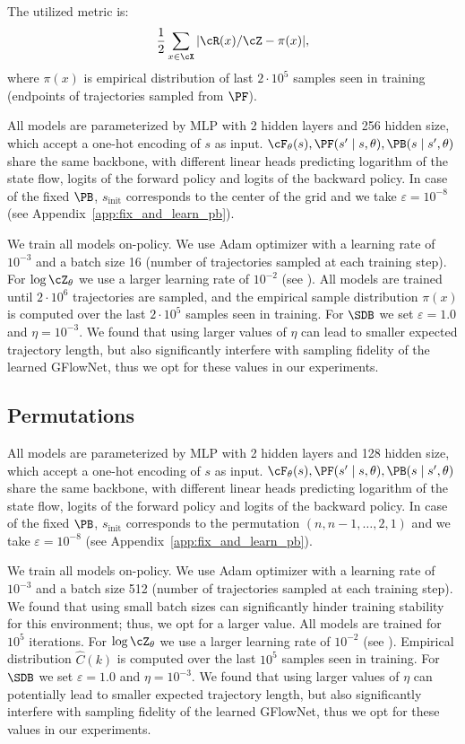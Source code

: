 The utilized metric is:
$$\frac{1}{2}\sum_{x \in \cX} |\cR(x) / \cZ - \pi(x)|,$$
where $\pi(x)$ is empirical distribution of last $2 \cdot 10^5$ samples seen in training (endpoints of trajectories sampled from $\PF$).


All models are parameterized by MLP with 2 hidden layers and 256 hidden size, which accept a one-hot encoding of $s$ as input. $\cF_{\theta}(s), \PF(s' \mid s, \theta), \PB(s \mid s', \theta)$ share the same backbone, with different linear heads predicting logarithm of the state flow, logits of the forward policy and logits of the backward policy. In case of the fixed $\PB$, $s_{\text{init}}$ corresponds to the center of the grid and we take $\varepsilon = 10^{-8}$ (see Appendix~\ref{app:fix_and_learn_pb}).

We train all models on-policy. We use Adam optimizer with a learning rate of $10^{-3}$ and a batch size 16 (number of trajectories sampled at each training step). For $\log \cZ_{\theta}$ we use a larger learning rate of $10^{-2}$ (see  \cite{malkin2022trajectory}). All models are trained until $2 \cdot 10^6$ trajectories are sampled, and the empirical sample distribution $\pi(x)$ is computed over the last $2 \cdot 10^{5}$ samples seen in training. For $\SDB$ we set $\varepsilon=1.0$ and $\eta = 10^{-3}$. We found that using larger values of $\eta$ can lead to smaller expected trajectory length, but also significantly interfere with sampling fidelity of the learned GFlowNet, thus we opt for these values in our experiments.


\subsection{Permutations}\label{app:exp_perms}


All models are parameterized by MLP with 2 hidden layers and 128 hidden size, which accept a one-hot encoding of $s$ as input. $\cF_{\theta}(s), \PF(s' \mid s, \theta), \PB(s \mid s', \theta)$ share the same backbone, with different linear heads predicting logarithm of the state flow, logits of the forward policy and logits of the backward policy. In case of the fixed $\PB$, $s_{\text{init}}$ corresponds to the permutation $(n, n - 1, \dots, 2, 1)$ and we take $\varepsilon = 10^{-8}$ (see Appendix~\ref{app:fix_and_learn_pb}). 

We train all models on-policy. We use Adam optimizer with a learning rate of $10^{-3}$ and a batch size 512 (number of trajectories sampled at each training step). We found that using small batch sizes can significantly hinder training stability for this environment; thus, we opt for a larger value. All models are trained for $10^5$ iterations. For $\log \cZ_{\theta}$ we use a larger learning rate of $10^{-2}$ (see \cite{malkin2022trajectory}). Empirical distribution $\hat{C}(k)$ is computed over the last $10^{5}$ samples seen in training. For $\SDB$ we set $\varepsilon=1.0$ and $\eta = 10^{-3}$. We found that using larger values of $\eta$ can potentially lead to smaller expected trajectory length, but also significantly interfere with sampling fidelity of the learned GFlowNet, thus we opt for these values in our experiments.

